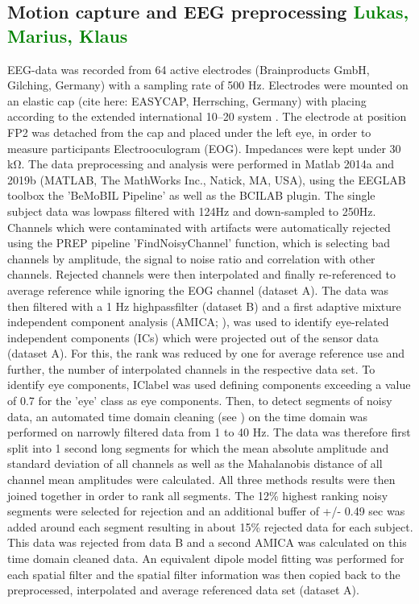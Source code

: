 \subsection{Motion capture and EEG preprocessing \textcolor{green}{Lukas, Marius, Klaus}}

EEG-data was recorded from 64 active electrodes (Brainproducts GmbH, Gilching, Germany) with a sampling rate of 500 Hz. Electrodes were mounted on an elastic cap (cite here: EASYCAP, Herrsching, Germany) with placing according to the extended international 10–20 system \cite{chatrian_ten_1985}. The electrode at position FP2 was detached from the cap and placed under the left eye, in order to measure participants Electrooculogram (EOG). Impedances were kept under 30 \si{\kohm}. The data preprocessing and analysis were performed in Matlab 2014a and 2019b  (MATLAB, The MathWorks Inc., Natick, MA, USA), using the EEGLAB toolbox \cite{delorme_eeglab:_2004} the 'BeMoBIL Pipeline' \cite{klug2018bemobil} as well as the BCILAB \cite{} plugin. The single subject data was lowpass filtered with 124Hz and down-sampled to 250Hz. Channels which were contaminated with artifacts were automatically rejected using the PREP pipeline \cite{bigdely-shamlo_prep_2015} 'FindNoisyChannel' function, which is selecting bad channels by amplitude, the signal to noise ratio and correlation with other channels. Rejected channels were then interpolated and finally re-referenced to average reference while ignoring the EOG channel (dataset A). The data was then filtered with a 1 Hz highpassfilter (dataset B) and a first adaptive mixture independent component analysis (AMICA; \cite{palmer_newton_2008}), was used to identify eye-related independent components (ICs) which were projected out of the sensor data (dataset A). For this, the rank was reduced by one for average reference use and further, the number of interpolated channels in the respective data set. To identify eye components, IClabel  \cite{pion2019iclabel} was used defining components exceeding a value of 0.7 for the 'eye' class as eye components.
Then, to detect segments of noisy data, an automated time domain cleaning (see \citet{gramann2018heading}) on the time domain was performed on narrowly filtered data from 1 to 40 Hz. The data was therefore first split into 1 second long segments for which the mean absolute amplitude and standard deviation of all channels as well as the Mahalanobis distance of all channel mean amplitudes were calculated. All three methods results were then joined together in order to rank all segments. The 12\% highest ranking noisy segments were selected for rejection and an additional buffer of +/- 0.49 sec was added around each segment resulting in about 15\% rejected data for each subject. This data was rejected from data B and a second AMICA was calculated on this time domain cleaned data. An equivalent dipole model fitting \cite{oostenveld2002validating} was performed for each spatial filter and the spatial filter information was then copied back to the preprocessed, interpolated and average referenced data set (dataset A).

